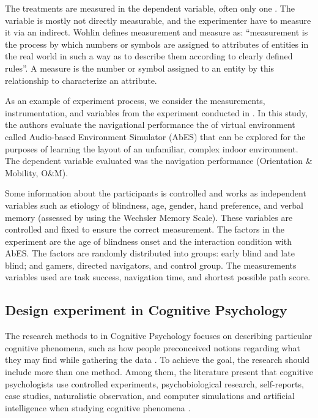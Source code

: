 The treatments are measured in the dependent variable, often only one \cite{Wohlin2000}. The variable is mostly not directly measurable, and the experimenter have to measure it via an indirect. Wohlin defines measurement and measure as: ``measurement is the process by which numbers or symbols are assigned to attributes of entities in the real world in such a way as to describe them according to clearly defined rules''. A measure is the number or symbol assigned to an entity by this relationship to characterize an attribute.

As an example of experiment process, we consider the measurements, instrumentation, and variables from the experiment conducted in . In this study, the authors evaluate the navigational performance the of virtual environment called Audio-based Environment Simulator (AbES) that can be explored for the purposes of learning the layout of an unfamiliar, complex indoor environment. The dependent variable evaluated was the navigation performance (Orientation \& Mobility, O\&M).

Some information about the participants is controlled and works as independent variables such as etiology of blindness, age, gender, hand preference, and verbal memory (assessed by using the Wechsler Memory Scale). These variables are controlled and fixed to ensure the correct measurement. The factors in the experiment are the age of blindness onset and the interaction condition with AbES. The factors are randomly distributed into groups: early blind and late blind; and gamers, directed navigators, and control group. The measurements variables used are task success, navigation time, and shortest possible path score.

\subsection{Design experiment in Cognitive Psychology}
\label{subsec:background-design-experiment-cognitive-psychology}
The research methods to in Cognitive Psychology focuses on describing particular cognitive phenomena, such as how people preconceived notions regarding what they may find while gathering the data \cite{Sternberg2011}. To achieve the goal, the research should include more than one method. Among them, the literature present that cognitive psychologists use controlled experiments, psychobiological research, self-reports, case studies, naturalistic observation, and computer simulations and artificial intelligence when studying cognitive phenomena \cite{Sternberg2011}.

